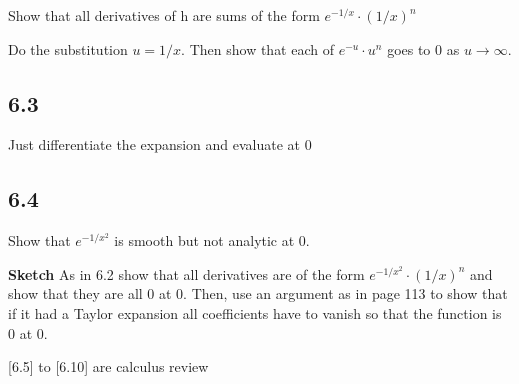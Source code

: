 \documentclass[]{article}
\begin{document}
Show that all derivatives of h are sums of the form 
$e^{-1/x} \cdot (1/x)^n$

Do the substitution $u = 1/x$. Then show that each of 
$e^{-u} \cdot u^n$ goes to 0 as $u \rightarrow \infty$.

\subsection*{6.3}
Just differentiate the expansion and evaluate at 0

\subsection*{6.4}
Show that $e^{-1/x^2}$ is smooth but not analytic at 0.

\textbf{Sketch}
As in 6.2 show that all derivatives are of the form $e^{-1/x^2} \cdot 
(1/x)^n$ and show that they are all 0 at 0. Then, use an argument as in page 113 to show that if it had a Taylor expansion all coefficients have to vanish so that the function is 0 at 0.


[6.5] to [6.10] are calculus review
\end{document}
